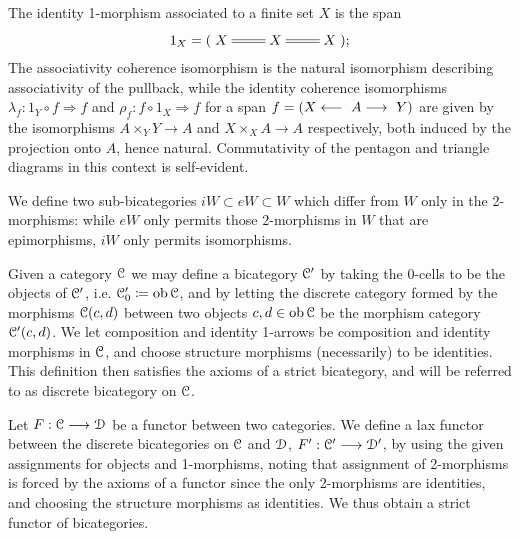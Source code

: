 \begin{defn}
    The identity 1-morphism associated to a finite set $X$ is the span %
    \begin{displaymath}
      1_X = (\xymatrix{ X & X \ar@{=}[l] \ar@{=}[r] & X});
    \end{displaymath}
    The associativity coherence isomorphism is the natural isomorphism describing associativity of the pullback, while the identity coherence isomorphisms $\lambda_f: 1_Y \circ f \Longrightarrow f$ and $\rho_f: f \circ 1_X \Longrightarrow f$ for a span $f=(X\longleftarrow~A\longrightarrow~Y)$ are given by the isomorphisms $A \times_Y Y \to A$ and $X \times_X A \to A$ respectively, both induced by the projection onto $A$, hence natural. Commutativity of the pentagon and triangle diagrams in this context is self-evident.
  \end{defn}

  \begin{defn}\label{def_subcategories_of_epimorphisms_and_isomorphisms}
    We define two sub-bicategories $iW \subset eW \subset W$ which differ from $W$ only in the 2-morphisms: while $eW$ only permits those 2-morphisms in $W$ that are epimorphisms, $iW$ only permits isomorphisms.
  \end{defn}

  \begin{rem}\label{rem_discrete_bicategory}
    Given a category $\mathcal{C}$ we may define a bicategory $\mathcal{C}^\prime$ by taking the 0-cells to be the objects of $\mathcal{C}^\prime$, i.e. $\mathcal{C}^\prime_0 \coloneqq \operatorname{ob} \mathcal{C}$, and by letting the discrete category formed by the morphisms $\mathcal{C}(c,d)$ between two objects $c,d \in \operatorname{ob} \mathcal{C}$ be the morphism category $\mathcal{C}^\prime(c,d)$. We let composition and identity 1-arrows be composition and identity morphisms in $\mathcal{C}$, and choose structure morphisms (necessarily) to be identities. This definition then satisfies the axioms of a strict bicategory, and will be referred to as discrete bicategory on $\mathcal{C}$.
  \end{rem}

  \begin{rem}\label{rem_discrete_bicategories_functors}
    Let $F: \mathcal{C} \longrightarrow \mathcal{D}$ be a functor between two categories. We define a lax
    functor between the discrete bicategories on $\mathcal{C}$ and $\mathcal{D}$, $F^\prime:
    \mathcal{C}^\prime \longrightarrow \mathcal{D}^\prime$, by using the given assignments for objects and
    1-morphisms, noting that assignment of 2-morphisms is forced by the axioms
    of a functor since the only 2-morphisms are identities, and choosing the
    structure morphisms as identities. We thus obtain a strict functor of
    bicategories.
  \end{rem}

